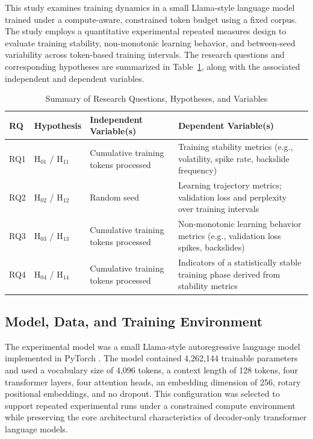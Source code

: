 \documentclass{article}
\begin{document}
This study examines training dynamics in a small Llama-style language model trained under a compute-aware, constrained token budget using a fixed corpus. The study employs a quantitative experimental repeated measures design to evaluate training stability, non-monotonic learning behavior, and between-seed variability across token-based training intervals. The research questions and corresponding hypotheses are summarized in Table~\ref{tab:rq_summary}, along with the associated independent and dependent variables.


\begin{table}[h]
\centering
\caption{Summary of Research Questions, Hypotheses, and Variables}
\label{tab:rq_summary}
\begin{tabular}{p{1.5cm} p{2cm} p{4.5cm} p{5cm}}
\hline
\textbf{RQ} & \textbf{Hypothesis} & \textbf{Independent Variable(s)} & \textbf{Dependent Variable(s)} \\
\hline
RQ1 & H$_{01}$ / H$_{11}$ & 
Cumulative training tokens processed & 
Training stability metrics (e.g., volatility, spike rate, backslide frequency) \\
\hline
RQ2 & H$_{02}$ / H$_{12}$ & 
Random seed & 
Learning trajectory metrics; validation loss and perplexity over training intervals \\
\hline
RQ3 & H$_{03}$ / H$_{13}$ & 
Cumulative training tokens processed & 
Non-monotonic learning behavior metrics (e.g., validation loss spikes, backslides) \\
\hline
RQ4 & H$_{04}$ / H$_{14}$ & 
Cumulative training tokens processed & 
Indicators of a statistically stable training phase derived from stability metrics \\
\hline
\end{tabular}
\end{table}


\subsection{Model, Data, and Training Environment}

The experimental model was a small Llama-style autoregressive language model implemented in PyTorch . The model contained 4,262,144 trainable parameters and used a vocabulary size of 4,096 tokens, a context length of 128 tokens, four transformer layers, four attention heads, an embedding dimension of 256, rotary positional embeddings, and no dropout. This configuration was selected to support repeated experimental runs under a constrained compute environment while preserving the core architectural characteristics of decoder-only transformer language models.
\end{document}
